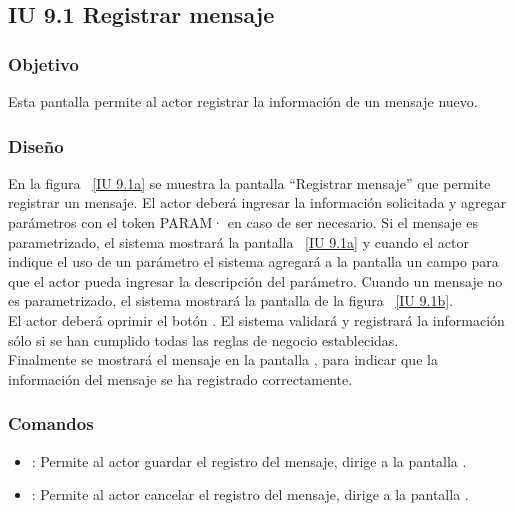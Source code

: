 \newpage 
\subsection{IU 9.1 Registrar mensaje}

\subsubsection{Objetivo}
	
	Esta pantalla permite al actor registrar la información de un mensaje nuevo.

\subsubsection{Diseño}

    En la figura ~\ref{IU 9.1a} se muestra la pantalla ``Registrar mensaje'' que permite registrar un mensaje. El actor deberá ingresar la información solicitada 
    y agregar parámetros con el token PARAM· en caso de ser necesario. Si el mensaje es parametrizado, el sistema mostrará la pantalla ~\ref{IU 9.1a} y 
    cuando el actor indique el uso de un parámetro el sistema agregará a la pantalla un campo para que el actor pueda ingresar la descripción del parámetro. 
    Cuando un mensaje no es parametrizado, el sistema mostrará la pantalla de la figura ~\ref{IU 9.1b}.\\
    
    El actor deberá oprimir el botón . El sistema validará y registrará la información sólo si se han cumplido todas las reglas de negocio establecidas.  \\
    
    Finalmente se mostrará el mensaje  en la pantalla , para indicar que la información del mensaje
    se ha registrado correctamente.        


\subsubsection{Comandos}
\begin{itemize}
	\item {}: Permite al actor guardar el registro del mensaje, dirige a la pantalla .
	\item {}: Permite al actor cancelar el registro del mensaje, dirige a la pantalla .
\end{itemize}

